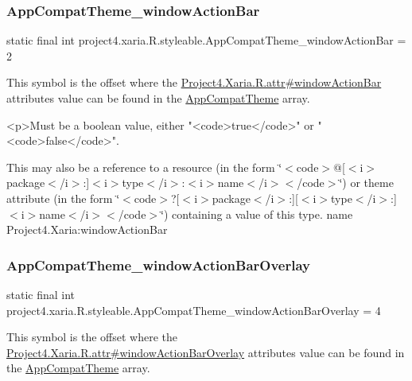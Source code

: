 \subsubsection{\texorpdfstring{App\+Compat\+Theme\+\_\+window\+Action\+Bar}{AppCompatTheme\_windowActionBar}}
{\footnotesize\ttfamily static final int project4.\+xaria.\+R.\+styleable.\+App\+Compat\+Theme\+\_\+window\+Action\+Bar = 2\hspace{0.3cm}{\ttfamily [static]}}

This symbol is the offset where the \hyperlink{}{Project4.\+Xaria.\+R.\+attr\#window\+Action\+Bar} attribute\textquotesingle{}s value can be found in the \hyperlink{classproject4_1_1xaria_1_1R_1_1styleable_aad8bec413e2350f9404e6ff0e831a85d}{App\+Compat\+Theme} array.

\begin{DoxyVerb}      <p>Must be a boolean value, either "<code>true</code>" or "<code>false</code>".
\end{DoxyVerb}
 

This may also be a reference to a resource (in the form \char`\"{}$<$code$>$@\mbox{[}$<$i$>$package$<$/i$>$\+:\mbox{]}$<$i$>$type$<$/i$>$\+:$<$i$>$name$<$/i$>$$<$/code$>$\char`\"{}) or theme attribute (in the form \char`\"{}$<$code$>$?\mbox{[}$<$i$>$package$<$/i$>$\+:\mbox{]}\mbox{[}$<$i$>$type$<$/i$>$\+:\mbox{]}$<$i$>$name$<$/i$>$$<$/code$>$\char`\"{}) containing a value of this type.  name Project4.\+Xaria\+:window\+Action\+Bar \mbox{\label{classproject4_1_1xaria_1_1R_1_1styleable_a06afb482b15287963396e764ae69b472}} 
\subsubsection{\texorpdfstring{App\+Compat\+Theme\+\_\+window\+Action\+Bar\+Overlay}{AppCompatTheme\_windowActionBarOverlay}}
{\footnotesize\ttfamily static final int project4.\+xaria.\+R.\+styleable.\+App\+Compat\+Theme\+\_\+window\+Action\+Bar\+Overlay = 4\hspace{0.3cm}{\ttfamily [static]}}

This symbol is the offset where the \hyperlink{}{Project4.\+Xaria.\+R.\+attr\#window\+Action\+Bar\+Overlay} attribute\textquotesingle{}s value can be found in the \hyperlink{classproject4_1_1xaria_1_1R_1_1styleable_aad8bec413e2350f9404e6ff0e831a85d}{App\+Compat\+Theme} array.

